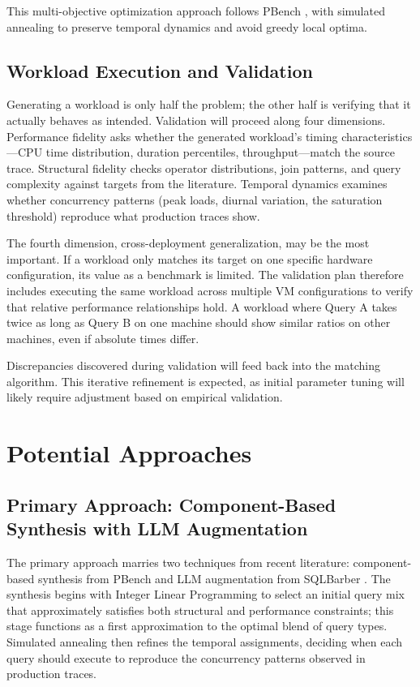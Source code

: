 \documentclass[12pt]{report}
\begin{document}
This multi-objective optimization approach follows PBench \cite{pbench}, with simulated annealing to preserve temporal dynamics and avoid greedy local optima.

\subsection{Workload Execution and Validation}
\label{subsec:execution-validation}

Generating a workload is only half the problem; the other half is verifying that it actually behaves as intended. Validation will proceed along four dimensions. Performance fidelity asks whether the generated workload's timing characteristics---CPU time distribution, duration percentiles, throughput---match the source trace. Structural fidelity checks operator distributions, join patterns, and query complexity against targets from the literature. Temporal dynamics examines whether concurrency patterns (peak loads, diurnal variation, the saturation threshold) reproduce what production traces show.

The fourth dimension, cross-deployment generalization, may be the most important. If a workload only matches its target on one specific hardware configuration, its value as a benchmark is limited. The validation plan therefore includes executing the same workload across multiple VM configurations to verify that relative performance relationships hold. A workload where Query A takes twice as long as Query B on one machine should show similar ratios on other machines, even if absolute times differ.

Discrepancies discovered during validation will feed back into the matching algorithm. This iterative refinement is expected, as initial parameter tuning will likely require adjustment based on empirical validation.

\section{Potential Approaches}
\label{sec:approaches}

\subsection{Primary Approach: Component-Based Synthesis with LLM Augmentation}
\label{subsec:primary-approach}

The primary approach marries two techniques from recent literature: component-based synthesis from PBench \cite{pbench} and LLM augmentation from SQLBarber \cite{sqlbarber}. The synthesis begins with Integer Linear Programming to select an initial query mix that approximately satisfies both structural and performance constraints; this stage functions as a first approximation to the optimal blend of query types. Simulated annealing then refines the temporal assignments, deciding when each query should execute to reproduce the concurrency patterns observed in production traces.
\end{document}
